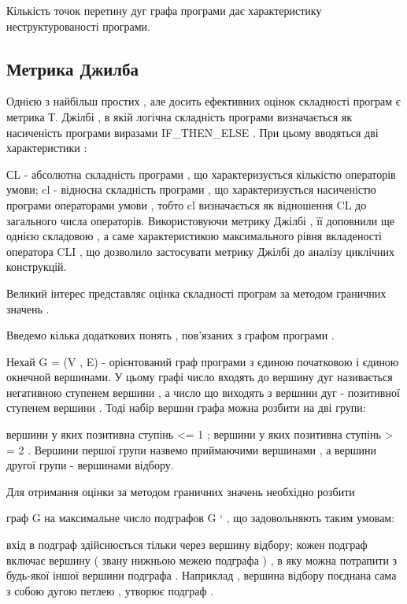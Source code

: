 \documentclass[oneside,final,14pt]{extreport}
\begin{document}
Кількість точок перетину дуг графа програми дає характеристику неструктурованості програми.


\subsection{Метрика Джилба}
\label{2section:id12}
Однією з найбільш простих , але досить ефективних оцінок складності програм є метрика Т. Джілбі , в якій логічна складність програми визначається як насиченість програми виразами IF\_THEN\_ELSE . При цьому вводяться дві характеристики :

СL - абсолютна складність програми , що характеризується кількістю операторів умови;
cl - відносна складність програми , що характеризується насиченістю програми операторами умови , тобто cl визначається як відношення CL до загального числа операторів.
Використовуючи метрику Джілбі , її доповнили ще однією складовою , а саме характеристикою максимального рівня вкладеності оператора CLI , що дозволило застосувати метрику Джілбі до аналізу циклічних конструкцій.

Великий інтерес представляє оцінка складності програм за методом граничних значень .

Введемо кілька додаткових понять , пов'язаних з графом програми .

Нехай G = (V , E) - орієнтований граф програми з єдиною початковою і єдиною окнечной вершинами. У цьому графі число входять до вершину дуг називається негативною ступенем вершини , а число що виходять з вершини дуг - позитивної ступенем вершини . Тоді набір вершин графа можна розбити на дві групи:

вершини у яких позитивна ступінь \textless{}= 1 ;
вершини у яких позитивна ступінь \textgreater{} = 2 .
Вершини першої групи назвемо приймаючими вершинами , а вершини другої групи - вершинами відбору.

Для отримання оцінки за методом граничних значень необхідно розбити

граф G на максимальне число подграфов G ` , що задовольняють таким умовам:

вхід в подграф здійснюється тільки через вершину відбору;
кожен подграф включає вершину ( звану нижньою межею подграфа ) , в яку можна потрапити з будь-якої іншої вершини подграфа . Наприклад , вершина відбору поєднана сама з собою дугою петлею , утворює подграф .
\end{document}
